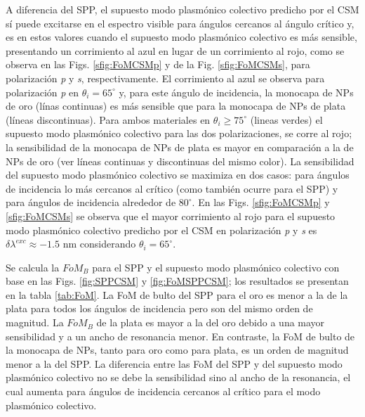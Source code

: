 A diferencia del SPP, el supuesto modo  plasmónico colectivo predicho por el CSM sí puede excitarse en el espectro visible para ángulos cercanos al ángulo crítico y, es en estos valores cuando el supuesto modo  plasmónico colectivo es más sensible, presentando un corrimiento al azul en lugar de un corrimiento al rojo, como se observa en las Figs. \ref{sfig:FoMCSMp} y de la Fig. \ref{sfig:FoMCSMs}, para polarización \emph{p} y \emph{s}, respectivamente. El corrimiento al azul se observa para polarización \emph{p} en $\theta_i=65^\circ$ y, para este ángulo de incidencia, la monocapa de NPs de oro (línas continuas) es más sensible que para la monocapa de NPs de plata (líneas discontinuas). Para ambos materiales en $\theta_i\geq 75^\circ$ (lineas verdes) el supuesto modo  plasmónico colectivo  para las dos polarizaciones,  se corre al rojo; la sensibilidad de la monocapa de NPs de plata es mayor en comparación a la de NPs de oro (ver líneas continuas y discontinuas del mismo color). La sensibilidad del supuesto modo  plasmónico colectivo se maximiza en dos casos: para ángulos de incidencia lo más cercanos al crítico (como también ocurre para el SPP)  y para ángulos de incidencia alrededor de $80^\circ$.   En las Figs. \ref{sfig:FoMCSMp} y \ref{sfig:FoMCSMs} se observa que el mayor corrimiento al rojo para el supuesto modo  plasmónico colectivo predicho por el CSM en polarización \emph{p} y \emph{s} es $\delta\lambda^{exc} \approx -1.5$ nm considerando $\theta_i=65^\circ$.

Se calcula la $\textit{FoM}_B$ para el SPP y el supuesto modo  plasmónico colectivo con base en las Figs. \ref{fig:SPPCSM} y \ref{fig:FoMSPPCSM}; los resultados se presentan en la tabla \ref{tab:FoM}. La FoM de bulto del SPP para el oro es menor a la de la plata para todos los ángulos de incidencia pero son del mismo orden de magnitud. La $\textit{FoM}_B$ de la plata es mayor a la del oro debido a una mayor sensibilidad y a un ancho de resonancia menor. En contraste, la FoM de bulto de la monocapa de NPs, tanto para oro como para plata, es un orden de magnitud menor a la del SPP. La diferencia entre las FoM del SPP y del supuesto modo plasmónico colectivo no se debe  la sensibilidad sino al ancho de la resonancia, el cual aumenta para ángulos de incidencia cercanos al crítico para el  modo plasmónico colectivo.

